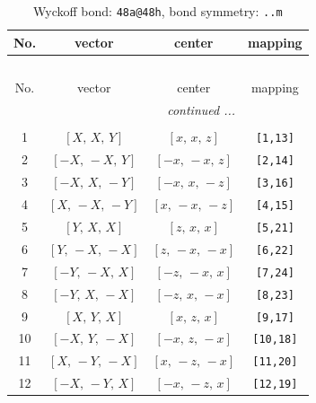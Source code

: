 \documentclass[fleqn,8pt]{jsarticle}
\begin{document}
\begin{longtable}{cccc}
\caption{Wyckoff bond: {\tt 48a@48h}, bond symmetry: {\tt ..m}}
 \\
 \hline \hline
No. & vector & center & mapping \\ \hline \endfirsthead

\multicolumn{3}{l}{\tablename\ \thetable{}} \\
 \hline \hline
No. & vector & center & mapping \\ \hline \endhead

 \hline \hline
\multicolumn{3}{r}{\footnotesize\it continued ...} \\ \endfoot

 \hline \hline
\multicolumn{3}{r}{} \\ \endlastfoot

1 & $\left[ X,\, X,\, Y \right]$ & $\left[ x,\, x,\, z \right]$ & {\tt [1,13]} \\ \hline
2 & $\left[ - X,\, - X,\, Y \right]$ & $\left[ - x,\, - x,\, z \right]$ & {\tt [2,14]} \\ \hline
3 & $\left[ - X,\, X,\, - Y \right]$ & $\left[ - x,\, x,\, - z \right]$ & {\tt [3,16]} \\ \hline
4 & $\left[ X,\, - X,\, - Y \right]$ & $\left[ x,\, - x,\, - z \right]$ & {\tt [4,15]} \\ \hline
5 & $\left[ Y,\, X,\, X \right]$ & $\left[ z,\, x,\, x \right]$ & {\tt [5,21]} \\ \hline
6 & $\left[ Y,\, - X,\, - X \right]$ & $\left[ z,\, - x,\, - x \right]$ & {\tt [6,22]} \\ \hline
7 & $\left[ - Y,\, - X,\, X \right]$ & $\left[ - z,\, - x,\, x \right]$ & {\tt [7,24]} \\ \hline
8 & $\left[ - Y,\, X,\, - X \right]$ & $\left[ - z,\, x,\, - x \right]$ & {\tt [8,23]} \\ \hline
9 & $\left[ X,\, Y,\, X \right]$ & $\left[ x,\, z,\, x \right]$ & {\tt [9,17]} \\ \hline
10 & $\left[ - X,\, Y,\, - X \right]$ & $\left[ - x,\, z,\, - x \right]$ & {\tt [10,18]} \\ \hline
11 & $\left[ X,\, - Y,\, - X \right]$ & $\left[ x,\, - z,\, - x \right]$ & {\tt [11,20]} \\ \hline
12 & $\left[ - X,\, - Y,\, X \right]$ & $\left[ - x,\, - z,\, x \right]$ & {\tt [12,19]} \\
\end{longtable}
\renewcommand{\arraystretch}{1.2}
\end{document}
